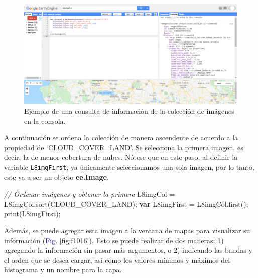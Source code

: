 \documentclass[
  12pt,
  letterpaper,
  twoside]{book}
\newenvironment{Shaded}{\begin{snugshade}}{\end{snugshade}}
\newcommand{\CommentTok}[1]{\textcolor[rgb]{0.24,0.58,0.00}{\textit{#1}}}
\newcommand{\ControlFlowTok}[1]{\textcolor[rgb]{0.00,0.00,0.00}{\textbf{#1}}}
\newcommand{\FunctionTok}[1]{\textcolor[rgb]{0.48,0.12,0.64}{#1}}
\newcommand{\NormalTok}[1]{#1}
\newcommand{\OperatorTok}[1]{\textcolor[rgb]{0.00,0.00,0.00}{#1}}
\newcommand{\StringTok}[1]{\textcolor[rgb]{0.87,0.29,0.22}{#1}}
\newcommand\boldpurple[1]{\textcolor{darkpurple}{\textbf{#1}}}
\begin{document}
\begin{figure}[H]

{\centering \includegraphics[width=0.95\linewidth]{Img/CamposImgCol} 

}

\caption{Ejemplo de una consulta de información de la colección de imágenes en la consola.}\label{fig:f1015}
\end{figure}

A continuación se ordena la colección de manera ascendente de acuerdo a la propiedad de `CLOUD\_COVER\_LAND'. Se selecciona la primera imagen, es decir, la de menor cobertura de nubes. Nótese que en este paso, al definir la variable \texttt{L8imgFirst}, ya únicamente seleccionamos una sola imagen, por lo tanto, este va a ser un objeto \boldpurple{ee.Image}.

\begin{Shaded}
\begin{Highlighting}[]
\CommentTok{// Ordenar imágenes y obtener la primera}
\NormalTok{L8imgCol }\OperatorTok{=}\NormalTok{ L8imgCol}\OperatorTok{.}\FunctionTok{sort}\NormalTok{(}\StringTok{\textquotesingle{}CLOUD\_COVER\_LAND\textquotesingle{}}\NormalTok{)}\OperatorTok{;}
\ControlFlowTok{var}\NormalTok{ L8imgFirst }\OperatorTok{=}\NormalTok{ L8imgCol}\OperatorTok{.}\FunctionTok{first}\NormalTok{()}\OperatorTok{;} 
\FunctionTok{print}\NormalTok{(L8imgFirst)}\OperatorTok{;}
\end{Highlighting}
\end{Shaded}

Además, se puede agregar esta imagen a la ventana de mapas para visualizar su información (\textcolor{darkblue}{Fig.} \ref{fig:f1016}). Esto se puede realizar de dos maneras: 1) agregando la información sin pasar más argumentos, o 2) indicando las bandas y el orden que se desea cargar, así como los valores mínimos y máximos del histograma y un nombre para la capa.
\end{document}
